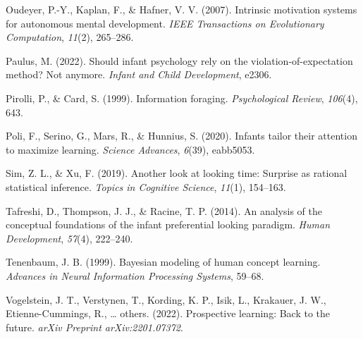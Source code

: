 \documentclass[10pt, letterpaper]{article}
\newenvironment{CSLReferences}%
  {}%
  {\par}
\begin{document}
\begin{CSLReferences}{1}{0}
\leavevmode{}%
Oudeyer, P.-Y., Kaplan, F., \& Hafner, V. V. (2007). Intrinsic
motivation systems for autonomous mental development. \emph{IEEE
Transactions on Evolutionary Computation}, \emph{11}(2), 265--286.

\leavevmode{}%
Paulus, M. (2022). Should infant psychology rely on the
violation-of-expectation method? Not anymore. \emph{Infant and Child
Development}, e2306.

\leavevmode{}%
Pirolli, P., \& Card, S. (1999). Information foraging.
\emph{Psychological Review}, \emph{106}(4), 643.

\leavevmode{}%
Poli, F., Serino, G., Mars, R., \& Hunnius, S. (2020). Infants tailor
their attention to maximize learning. \emph{Science Advances},
\emph{6}(39), eabb5053.

\leavevmode{}%
Sim, Z. L., \& Xu, F. (2019). Another look at looking time: Surprise as
rational statistical inference. \emph{Topics in Cognitive Science},
\emph{11}(1), 154--163.

\leavevmode{}%
Tafreshi, D., Thompson, J. J., \& Racine, T. P. (2014). An analysis of
the conceptual foundations of the infant preferential looking paradigm.
\emph{Human Development}, \emph{57}(4), 222--240.

\leavevmode{}%
Tenenbaum, J. B. (1999). Bayesian modeling of human concept learning.
\emph{Advances in Neural Information Processing Systems}, 59--68.

\leavevmode{}%
Vogelstein, J. T., Verstynen, T., Kording, K. P., Isik, L., Krakauer, J.
W., Etienne-Cummings, R., \ldots{} others. (2022). Prospective learning:
Back to the future. \emph{arXiv Preprint arXiv:2201.07372}.

\end{CSLReferences}


\end{document}
